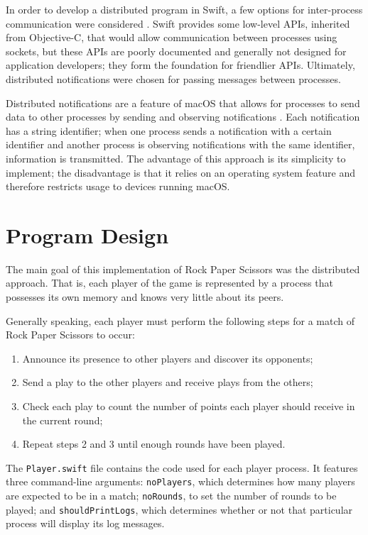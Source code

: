 \documentclass[11pt]{article}
\begin{document}
In order to develop a distributed program in Swift, a few options for inter-process communication were considered \cite{interprocess}.
Swift provides some low-level APIs, inherited from Objective-C, that would allow communication between processes using sockets, but these APIs are poorly documented and generally not designed for application developers; they form the foundation for friendlier APIs.
Ultimately, distributed notifications were chosen for passing messages between processes.

Distributed notifications are a feature of macOS that allows for processes to send data to other processes by sending and observing notifications \cite{distributednotificationcenter}.
Each notification has a string identifier; when one process sends a notification with a certain identifier and another process is observing notifications with the same identifier, information is transmitted.
The advantage of this approach is its simplicity to implement; the disadvantage is that it relies on an operating system feature and therefore restricts usage to devices running macOS.


\section{Program Design}
The main goal of this implementation of Rock Paper Scissors was the distributed approach. That is, each player of the game is represented by a process that possesses its own memory and knows very little about its peers.

Generally speaking, each player must perform the following steps for a match of Rock Paper Scissors to occur:
\begin{enumerate}
	\item Announce its presence to other players and discover its opponents;
	\item Send a play to the other players and receive plays from the others;
	\item Check each play to count the number of points each player should receive in the current round;
	\item Repeat steps 2 and 3 until enough rounds have been played.
\end{enumerate}

The \texttt{Player.swift} file contains the code used for each player process. It features three command-line arguments: \texttt{noPlayers}, which determines how many players are expected to be in a match; \texttt{noRounds}, to set the number of rounds to be played; and \texttt{shouldPrintLogs}, which determines whether or not that particular process will display its log messages.
\end{document}
